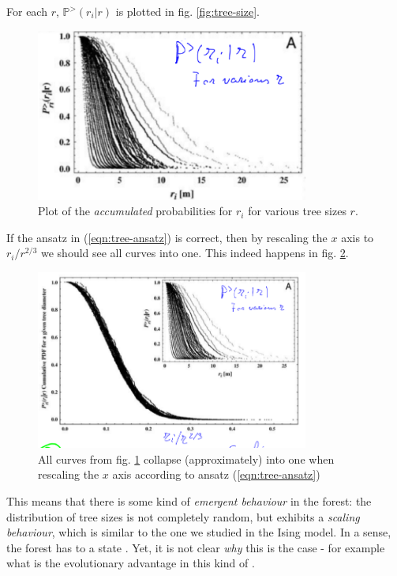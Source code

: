 \documentclass[../../main.tex]{subfiles}
\begin{document}
For each $r$, $\mathbb{P}^>(r_i|r)$ is plotted in fig. \ref{fig:tree-size}.

\begin{figure}[H]
    \centering
    \includegraphics[width=0.8\textwidth]{tree_size.png}
    \caption{Plot of the \textit{accumulated} probabilities for $r_i$ for various tree sizes $r$.}
    \label{fig:tree_size}
\end{figure}

If the ansatz in (\ref{eqn:tree-ansatz}) is correct, then by rescaling the $x$ axis to $r_i/r^{2/3}$ we should see all curves  into one. This indeed happens in fig. \ref{fig:tree-collapse}.

\begin{figure}[H]
    \centering
    \includegraphics[width=0.8\textwidth]{tree-collapse.png}
    \caption{All curves from fig. \ref{fig:tree_size} collapse (approximately) into one when rescaling the $x$ axis according to ansatz (\ref{eqn:tree-ansatz})}
    \label{fig:tree-collapse}
\end{figure}

This means that there is some kind of \textit{emergent behaviour} in the forest: the distribution of tree sizes is not completely random, but exhibits a \textit{scaling behaviour}, which is similar to the one we studied in the Ising model. In a sense, the forest has  to a state . Yet, it is not clear \textit{why} this is the case - for example what is the evolutionary advantage in this kind of .
\end{document}
